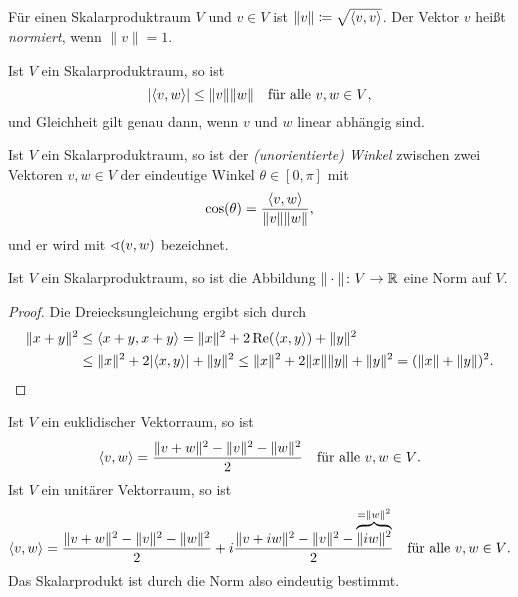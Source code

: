 \begin{definition}
  Für einen Skalarproduktraum $V$ und $v \in V$ ist $\|v\| \coloneqq \sqrt{\left\langle v,v \right\rangle}$.
  Der Vektor $v$ heißt \emph{normiert}, wenn $\|v\| = 1$.
\end{definition}


\begin{proposition}
  Ist $V$ ein Skalarproduktraum, so ist
  \[
    |\langle v,w \rangle| \leq \|v\| \|w\|
    \quad
    \text{für alle $v, w \in V$},
  \]
  und Gleichheit gilt genau dann, wenn $v$ und $w$ linear abhängig sind.
\end{proposition}


\begin{definition}
  Ist $V$ ein Skalarproduktraum, so ist der \emph{(unorientierte) Winkel} zwischen zwei Vektoren $v, w \in V$ der eindeutige Winkel $\theta \in [0,\pi]$ mit
  \[
    \cos(\theta) = \frac{\left\langle v,w \right\rangle}{\|v\| \|w\|},
  \]
  und er wird mit $\sphericalangle(v,w)$ bezeichnet.
\end{definition}


\begin{corollary}
  Ist $V$ ein Skalarproduktraum, so ist die Abbildung $\|\cdot\| \colon V \to \mathbb{R}$ eine Norm auf $V$.
\end{corollary}


\begin{proof}
  Die Dreiecksungleichung ergibt sich durch
  \begin{align*}
          \|x + y\|^2
    &\leq \left\langle x + y, x + y \right\rangle
     =    \|x\|^2 + 2 \operatorname{Re}( \left\langle x, y \right\rangle ) + \|y\|^2
    \\
    &\leq \|x\|^2 + 2 |\langle x, y \rangle| + \|y\|^2
     \leq \|x\|^2 + 2 \|x\| \|y\| + \|y\|^2
     =    (\|x\| + \|y\|)^2.
    \qedhere
  \end{align*}
\end{proof}


\begin{lemma}[Polarisationsformel]
  Ist $V$ ein euklidischer Vektorraum, so ist
  \[
      \left\langle v,w \right\rangle
    = \frac{\|v+w\|^2 - \|v\|^2 - \|w\|^2}{2}
    \quad\text{für alle $v, w \in V$}.
  \]
  Ist $V$ ein unitärer Vektorraum, so ist
  \[
      \left\langle v,w \right\rangle
    = \frac{\|v+w\|^2-\|v\|^2-\|w\|^2}{2}
      + i \frac{\|v+iw\|^2-\|v\|^2-\overbrace{\|iw\|^2}^{= \|w\|^2}}{2}
    \quad\text{für alle $v, w \in V$}.
  \]
  Das Skalarprodukt ist durch die Norm also eindeutig bestimmt.
\end{lemma}


